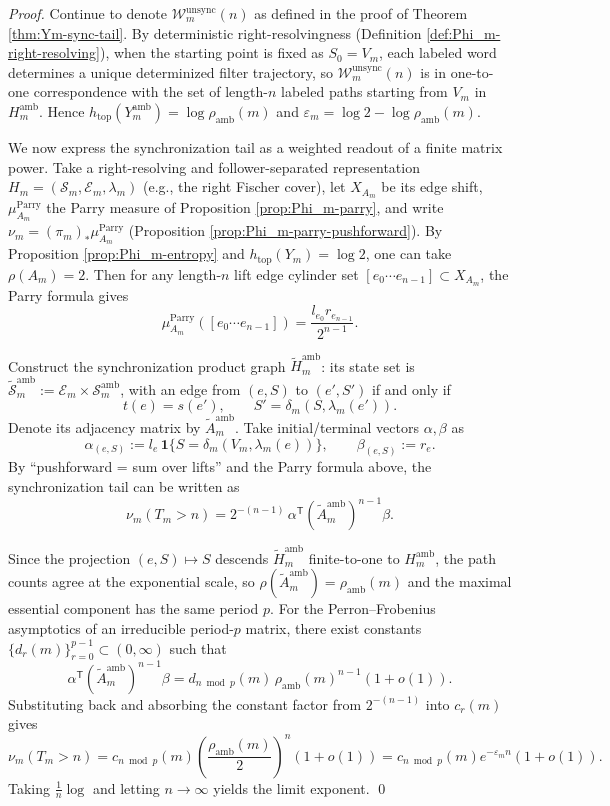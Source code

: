 \begin{proof}
Continue to denote \(\mathcal{W}_{m}^{\mathrm{unsync}}(n)\) as defined in the proof of Theorem \ref{thm:Ym-sync-tail}.
By deterministic right-resolvingness (Definition \ref{def:Phi_m-right-resolving}), when the starting point is fixed as \(S_0=V_m\), each labeled word determines a unique determinized filter trajectory, so \(\mathcal{W}_{m}^{\mathrm{unsync}}(n)\) is in one-to-one correspondence with the set of length-\(n\) labeled paths starting from \(V_m\) in \(H_m^{\mathrm{amb}}\).
Hence \(h_{\mathrm{top}}(Y_m^{\mathrm{amb}})=\log\rho_{\mathrm{amb}}(m)\) and \(\varepsilon_m=\log 2-\log\rho_{\mathrm{amb}}(m)\).
\par
We now express the synchronization tail as a weighted readout of a finite matrix power.
Take a right-resolving and follower-separated representation
\(
H_m=(\mathcal{S}_m,\mathcal{E}_m,\lambda_m)
\)
(e.g., the right Fischer cover), let \(X_{A_m}\) be its edge shift, \(\mu_{A_m}^{\mathrm{Parry}}\) the Parry measure of Proposition \ref{prop:Phi_m-parry}, and write \(\nu_m=(\pi_m)_*\mu_{A_m}^{\mathrm{Parry}}\) (Proposition \ref{prop:Phi_m-parry-pushforward}).
By Proposition \ref{prop:Phi_m-entropy} and \(h_{\mathrm{top}}(Y_m)=\log 2\), one can take \(\rho(A_m)=2\).
Then for any length-\(n\) lift edge cylinder set \([e_0\cdots e_{n-1}]\subset X_{A_m}\), the Parry formula gives
\[
\mu_{A_m}^{\mathrm{Parry}}([e_0\cdots e_{n-1}])=\frac{l_{e_0}r_{e_{n-1}}}{2^{n-1}}.
\]
\par
Construct the synchronization product graph \(\widetilde H_m^{\mathrm{amb}}\): its state set is
\(
\widetilde{\mathcal{S}}_m^{\mathrm{amb}}:=\mathcal{E}_m\times\mathcal{S}_m^{\mathrm{amb}}
\), with an edge from \((e,S)\) to \((e',S')\) if and only if
\[
t(e)=s(e'),\qquad S'=\delta_m(S,\lambda_m(e')).
\]
Denote its adjacency matrix by \(\widetilde A_m^{\mathrm{amb}}\).
Take initial/terminal vectors \(\alpha,\beta\) as
\[
\alpha_{(e,S)}:=l_e\,\mathbf{1}\{S=\delta_m(V_m,\lambda_m(e))\},
\qquad
\beta_{(e,S)}:=r_e.
\]
By ``pushforward = sum over lifts'' and the Parry formula above, the synchronization tail can be written as
\[
\nu_m(T_m>n)=2^{-(n-1)}\,\alpha^{\mathsf T}(\widetilde A_m^{\mathrm{amb}})^{n-1}\beta.
\]
\par
Since the projection \((e,S)\mapsto S\) descends \(\widetilde H_m^{\mathrm{amb}}\) finite-to-one to \(H_m^{\mathrm{amb}}\), the path counts agree at the exponential scale, so \(\rho(\widetilde A_m^{\mathrm{amb}})=\rho_{\mathrm{amb}}(m)\) and the maximal essential component has the same period \(p\).
For the Perron--Frobenius asymptotics of an irreducible period-\(p\) matrix, there exist constants \(\{d_r(m)\}_{r=0}^{p-1}\subset(0,\infty)\) such that
\[
\alpha^{\mathsf T}(\widetilde A_m^{\mathrm{amb}})^{n-1}\beta
=d_{n\bmod p}(m)\,\rho_{\mathrm{amb}}(m)^{n-1}(1+o(1)).
\]
Substituting back and absorbing the constant factor from \(2^{-(n-1)}\) into \(c_r(m)\) gives
\[
\nu_m(T_m>n)
=c_{n\bmod p}(m)\left(\frac{\rho_{\mathrm{amb}}(m)}{2}\right)^{\!n}(1+o(1))
=c_{n\bmod p}(m)e^{-\varepsilon_m n}(1+o(1)).
\]
Taking \(\frac1n\log\) and letting \(n\to\infty\) yields the limit exponent. \qed
\end{proof}

